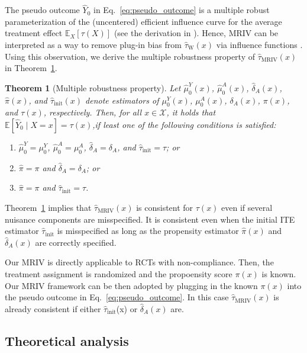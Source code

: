 \documentclass[nonatbib]{article}
\newcommand{\E}{\mathbb{E}}
\newcommand{\frameworkname}{MRIV\xspace}
\theoremstyle{definition}
\theoremstyle{plain}
\newtheorem{theorem}{Theorem}
\begin{document}
The pseudo outcome $\hat{Y}_0$ in Eq.~\eqref{eq:pseudo_outcome} is a multiple robust parameterization of the (uncentered) efficient influence curve for the average treatment effect $\E_X[\tau(X)]$ (see the derivation in \cite{Wang.2018}). Hence, \frameworkname can be interpreted as a way to remove plug-in bias from $\hat{\tau}_{\mathrm{W}}(x)$ via influence functions \cite{Curth.2020}. Using this observation, we derive the multiple robustness property of $\hat{\tau}_{\mathrm{MRIV}}(x)$ in Theorem~\ref{thrm:robustness}.

\begin{theorem}[Multiple robustness property]\label{thrm:robustness}
Let $\hat{\mu}_0^Y(x)$, $\hat{\mu}_0^A(x)$, $\hat{\delta}_A(x)$, $\hat{\pi}(x)$, and $\hat{\tau}_{\mathrm{init}}(x)$ denote estimators of $\mu_0^Y(x)$, $\mu_0^A(x)$, $\delta_A(x)$, $\pi(x)$, and $\tau(x)$, respectively. Then, for all $x \in \mathcal{X}$, it holds that $\E[\hat{Y}_0 \mid X = x] = \tau(x)$,if least one of the following conditions is satisfied:
\begin{enumerate}
    \item $\hat{\mu}_0^Y = \mu_0^Y$, $\hat{\mu}_0^A = \mu_0^A$, $\hat{\delta}_A = \delta_A$, and $\hat{\tau}_{\mathrm{init}} = \tau$; or
    \item $\hat{\pi} = \pi$ and $\hat{\delta}_A = \delta_A$; or
    \item $\hat{\pi} = \pi$ and $\hat{\tau}_{\mathrm{init}} = \tau$.
\end{enumerate}
\end{theorem}
Theorem~\ref{thrm:robustness} implies that $\hat{\tau}_{\mathrm{MRIV}}(x)$ is consistent for $\tau(x)$ even if several nuisance components are misspecified. It is consistent even when the initial ITE estimator $\hat{\tau}_{\mathrm{init}}$ is misspecified as long as the propensity estimator $\hat{\pi}(x)$ and $\hat{\delta}_A(x)$ are correctly specified.

Our \frameworkname is directly applicable to RCTs with non-compliance. Then, the treatment assignment is randomized and the propoensity score $\pi(x)$ is known. Our \frameworkname framework can be then adopted by plugging in the known $\pi(x)$ into the pseudo outcome in Eq.~\eqref{eq:pseudo_outcome}. In this case $\hat{\tau}_{\mathrm{MRIV}}(x)$ is already consistent if either $\hat{\tau}_{\mathrm{init}}$(x) or $\hat{\delta}_A(x)$ are.

\subsection{Theoretical analysis}
\label{sec:theory}
\end{document}
